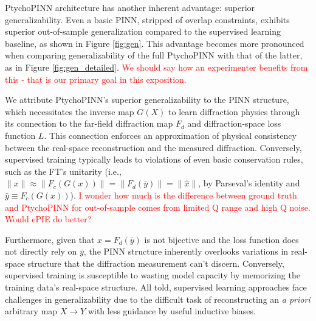 \documentclass[sn-mathphys]{sn-jnl}%
\theoremstyle{thmstyleone}%
\theoremstyle{thmstyletwo}%
\theoremstyle{thmstylethree}%
\begin{document}
PtychoPINN architecture has another inherent advantage: superior generalizability. Even a basic PINN, stripped of overlap constraints, exhibits superior out-of-sample generalization compared to the supervised learning baseline, as shown in Figure \ref{fig:gen}. This advantage becomes more pronounced when comparing generalizability of the full PtychoPINN with that of the latter, as in Figure \ref{fig:gen_detailed}. \textcolor{red}{We should say how an experimenter benefits from this - that is our primary goal in this exposition.}

We attribute PtychoPINN's superior generalizability to the PINN structure, which necessitates the inverse map $G(X)$ to learn diffraction physics through its connection to the far-field diffraction map $F_d$ and diffraction-space loss function $L$. This connection enforces an approximation of physical consistency between the real-space reconstruction and the measured diffraction. Conversely, supervised training typically leads to violations of even basic conservation rules, such as the FT's unitarity (i.e., $\lVert x \rVert \approx \lVert F_c(G(x)) \rVert = \lVert F_d(\bar{y}) \rVert = \lVert \hat{x} \rVert$, by Parseval's identity and $\bar{y} \equiv F_c(G(x))$). \textcolor{red}{I wonder how much is the difference between ground truth and PtychoPINN for out-of-sample comes from limited Q range and high Q noise.  Would ePIE do better?}

Furthermore, given that $\hat{x} = F_d(\bar{y})$ is not bijective and the loss function does not directly rely on $\bar{y}$, the PINN structure inherently overlooks variations in real-space structure that the diffraction measurement can't discern. Conversely, supervised training is susceptible to wasting model capacity by memorizing the training data's real-space structure. All told, supervised learning approaches face challenges in generalizability due to the difficult task of reconstructing an \emph{a priori} arbitrary map $X \rightarrow Y$ with less guidance by useful inductive biases.

\end{document}
